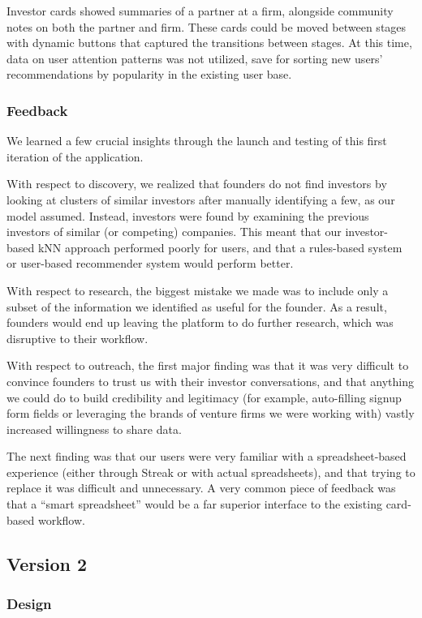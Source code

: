 Investor cards showed summaries of a partner at a firm, alongside community notes on both the partner and firm. These cards could be moved between stages with dynamic buttons that captured the transitions between stages. At this time, data on user attention patterns was not utilized, save for sorting new users' recommendations by popularity in the existing user base.

\subsubsection{Feedback}

We learned a few crucial insights through the launch and testing of this first iteration of the application.

With respect to discovery, we realized that founders do not find investors by looking at clusters of similar investors after manually identifying a few, as our model assumed. Instead, investors were found by examining the previous investors of similar (or competing) companies. This meant that our investor-based kNN approach performed poorly for users, and that a rules-based system or user-based recommender system would perform better.

With respect to research, the biggest mistake we made was to include only a subset of the information we identified as useful for the founder. As a result, founders would end up leaving the platform to do further research, which was disruptive to their workflow.

With respect to outreach, the first major finding was that it was very difficult to convince founders to trust us with their investor conversations, and that anything we could do to build credibility and legitimacy (for example, auto-filling signup form fields or leveraging the brands of venture firms we were working with) vastly increased willingness to share data.

The next finding was that our users were very familiar with a spreadsheet-based experience (either through Streak or with actual spreadsheets), and that trying to replace it was difficult and unnecessary. A very common piece of feedback was that a ``smart spreadsheet'' would be a far superior interface to the existing card-based workflow.

\subsection{Version 2}

\subsubsection{Design}


